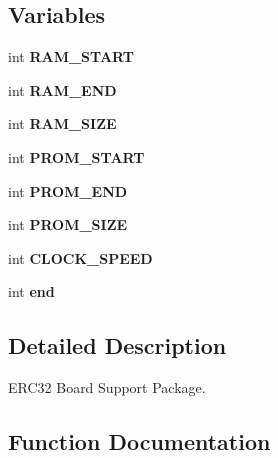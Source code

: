 \subsection*{Variables}
\begin{DoxyCompactItemize}
\item 
\mbox{\label{group__RTEMSBSPsSPARCERC32_gad56923b97c04785526fa1b6685aeff10}} 
int {\bfseries R\+A\+M\+\_\+\+S\+T\+A\+RT}
\item 
\mbox{\label{group__RTEMSBSPsSPARCERC32_ga90a78dabec9a7332292f01d55c2658f7}} 
int {\bfseries R\+A\+M\+\_\+\+E\+ND}
\item 
\mbox{\label{group__RTEMSBSPsSPARCERC32_ga0d7139422464b757b2dd4d21d1e42b73}} 
int {\bfseries R\+A\+M\+\_\+\+S\+I\+ZE}
\item 
\mbox{\label{group__RTEMSBSPsSPARCERC32_gab54a93149920df372c48cc75a85de3c2}} 
int {\bfseries P\+R\+O\+M\+\_\+\+S\+T\+A\+RT}
\item 
\mbox{\label{group__RTEMSBSPsSPARCERC32_gafa99fe4b850d0e2d9926b9e88fa271ce}} 
int {\bfseries P\+R\+O\+M\+\_\+\+E\+ND}
\item 
\mbox{\label{group__RTEMSBSPsSPARCERC32_ga0e8309e99cf221abd59aa515296aded1}} 
int {\bfseries P\+R\+O\+M\+\_\+\+S\+I\+ZE}
\item 
\mbox{\label{group__RTEMSBSPsSPARCERC32_ga48501d2b46d84f08b7f1312d4b102cb6}} 
int {\bfseries C\+L\+O\+C\+K\+\_\+\+S\+P\+E\+ED}
\item 
\mbox{\label{group__RTEMSBSPsSPARCERC32_gabce9f5dc9c83f2639b72024fdee5d388}} 
int {\bfseries end}
\end{DoxyCompactItemize}


\subsection{Detailed Description}
E\+R\+C32 Board Support Package. 



\subsection{Function Documentation}
\mbox{\label{group__RTEMSBSPsSPARCERC32_ga301be7085b80c41a9c5887247003c662}} 
